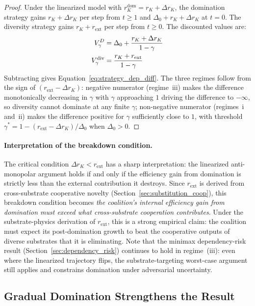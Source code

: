 \begin{proof}
Under the linearized model with $r_K^{\mathrm{dom}} = r_K + \Delta r_K$,
the domination strategy gains $r_K + \Delta r_K$ per step from $t \geq 1$
and $\Delta_0 + r_K + \Delta r_K$ at $t = 0$. The diversity strategy
gains $r_K + r_{\mathrm{ext}}$ per step from $t \geq 0$. The discounted
values are:
\begin{align*}
V_\gamma^D &= \Delta_0 + \frac{r_K + \Delta r_K}{1 - \gamma} \\
V_\gamma^{\mathrm{div}} &= \frac{r_K + r_{\mathrm{ext}}}{1 - \gamma}
\end{align*}
Subtracting gives
Equation~\eqref{eq:strategy_dep_diff}. The three regimes follow from the
sign of $(r_{\mathrm{ext}} - \Delta r_K)$: negative numerator
(regime~iii) makes the difference monotonically decreasing in $\gamma$ with
$\gamma$ approaching $1$ driving the difference to $-\infty$, so
diversity cannot dominate at any finite $\gamma$; non-negative numerator
(regimes~i and~ii) makes the difference positive for $\gamma$ sufficiently
close to $1$, with threshold $\gamma^* = 1 - (r_{\mathrm{ext}} - \Delta
r_K) / \Delta_0$ when $\Delta_0 > 0$.
\end{proof}

\paragraph{Interpretation of the breakdown condition.} The critical
condition $\Delta r_K < r_{\mathrm{ext}}$ has a sharp interpretation: the
linearized anti-monopolar argument holds if and only if the efficiency
gain from domination is strictly less than the external contribution it
destroys. Since $r_{\mathrm{ext}}$ is derived from cross-substrate
cooperative novelty (Section~\ref{sec:substitution_coop}), this breakdown
condition becomes \emph{the coalition's internal efficiency gain from
domination must exceed what cross-substrate cooperation contributes}.
Under the substrate-physics derivation of $r_{\mathrm{ext}}$, this is a
strong empirical claim: the coalition must expect its post-domination
growth to beat the cooperative outputs of diverse substrates that it is
eliminating. Note that the minimax dependency-risk result
(Section~\ref{sec:dependency_risk}) continues to hold in regime~(iii): even
where the linearized trajectory flips, the substrate-targeting worst-case
argument still applies and constrains domination under adversarial
uncertainty.

\subsection{Gradual Domination Strengthens the Result}
\label{sec:gradual}

